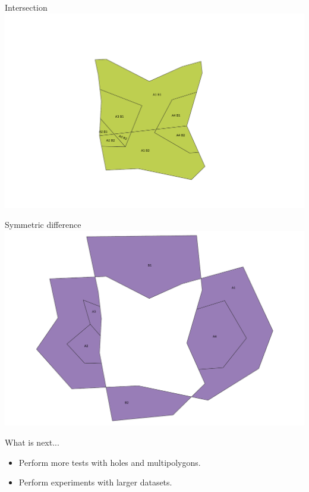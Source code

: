 \documentclass{beamer}
\begin{document}
\begin{frame}{Intersection}
    \centering 
    \includegraphics[trim=3cm 0cm 2cm 0cm, clip, width=0.75\linewidth]{figures/Holes04} 
\end{frame}
\begin{frame}{Symmetric difference}
    \centering 
    \includegraphics[trim=3cm 0cm 2cm 0cm, clip, width=0.75\linewidth]{figures/Holes05} 
\end{frame}

\begin{frame}{What is next...}
    \begin{itemize}
        \item Perform more tests with holes and multipolygons.
        \item Perform experiments with larger datasets.
    \end{itemize}
\end{frame}
\end{document}
